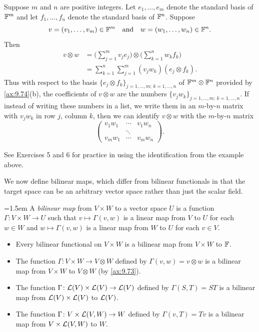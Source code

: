 \begin{example}\label{ax:9.76}
Suppose $m$ and $n$ are positive integers. Let $e_1,\dots,e_m$ denote the
standard basis of $\mathbb{F}^m$ and let $f_1,\dots,f_n$ denote the standard basis of
$\mathbb{F}^n$. Suppose
\[ v = (v_1,\dots,v_m)\in\mathbb{F}^m \quad\text{and}\quad w = (w_1,\dots,w_n)\in\mathbb{F}^n. \]
Then
\begin{align*}
v\otimes w &= \biggl(\sum_{j=1}^m v_je_j\biggr)\otimes
              \biggl(\sum_{k=1}^n w_kf_k\biggr)\\
           &= \sum_{k=1}^n\sum_{j=1}^m (v_jw_k)(e_j\otimes f_k).
\end{align*}
Thus with respect to the basis
$\{e_j\otimes f_k\}_{j=1,\dots,m;\,k=1,\dots,n}$ of $\mathbb{F}^m\otimes\mathbb{F}^n$ provided
by \ref{ax:9.74}(b), the coefficients of $v\otimes w$ are the numbers
$\{v_jw_k\}_{j=1,\dots,m;\,k=1,\dots,n}$. If instead of writing these numbers
in a list, we write them in an $m$-by-$n$ matrix with $v_jw_k$ in row $j$,
column $k$, then we can identify $v\otimes w$ with the $m$-by-$n$ matrix
\[ \begin{pmatrix} v_1w_1 & \cdots & v_1w_n\\
                          & \ddots &       \\
                   v_mw_1 & \cdots & v_mw_n \end{pmatrix}. \]
\end{example}

See Exercises 5 and 6 for practice in using the identification from the
example above.

We now define bilinear maps, which differ from bilinear functionals in that the
target space can be an arbitrary vector space rather than just the scalar
field.

\begin{definition}\label{ax:9.77}\emergencystretch=1.5em
A \emph{bilinear map} from $V\times W$ to a vector space $U$ is a function
$\Gamma\colon V\times W\to U$ such that $v\mapsto\Gamma(v,w)$ is a linear map
from $V$ to $U$ for each $w\in W$ and $w\mapsto\Gamma(v,w)$ is a linear map
from $W$ to $U$ for each $v\in V$.
\end{definition}

\begin{example}\label{ax:9.78}\leavevmode
\begin{itemize}
\item Every bilinear functional on $V\times W$ is a bilinear map from
  $V\times W$ to $\mathbb{F}$.
\item The function $\Gamma\colon V\times W\to V\otimes W$ defined by
  $\Gamma(v,w)=v\otimes w$ is a bilinear map from $V\times W$ to $V\otimes W$
  (by \ref{ax:9.73}).
\item The function $\Gamma\colon\mathcal{L}(V)\times\mathcal{L}(V)\to\mathcal{L}(V)$ defined by
  $\Gamma(S,T)=ST$ is a bilinear map from $\mathcal{L}(V)\times\mathcal{L}(V)$ to $\mathcal{L}(V)$.
\item The function $\Gamma\colon V\times\mathcal{L}(V,W)\to W$ defined by
  $\Gamma(v,T)=Tv$ is a bilinear map from $V\times\mathcal{L}(V,W)$ to $W$.
\end{itemize}
\end{example}

